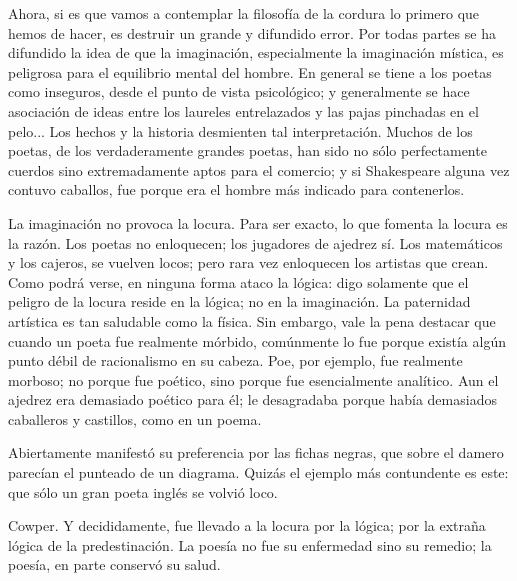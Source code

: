 Ahora, si es que vamos a contemplar la filosofía de la cordura lo primero que hemos de hacer, es
destruir un grande y difundido error. Por todas partes se ha difundido la idea de que la imaginación,
especialmente la imaginación mística, es peligrosa para el equilibrio mental del hombre. En general se
tiene a los poetas como inseguros, desde el punto de vista psicológico; y generalmente se hace asociación
de ideas entre los laureles entrelazados y las pajas pinchadas en el pelo... Los hechos y la historia
desmienten tal interpretación. Muchos de los poetas, de los verdaderamente grandes poetas, han sido no
sólo perfectamente cuerdos sino extremadamente aptos para el comercio; y si Shakespeare alguna vez
contuvo caballos, fue porque era el hombre más indicado para contenerlos.

La imaginación no provoca la locura. Para ser exacto, lo que fomenta la locura es la razón. Los
poetas no enloquecen; los jugadores de ajedrez sí. Los matemáticos y los cajeros, se vuelven locos; pero
rara vez enloquecen los artistas que crean. Como podrá verse, en ninguna forma ataco la lógica: digo
solamente que el peligro de la locura reside en la lógica; no en la imaginación. La paternidad artística es
tan saludable como la física. Sin embargo, vale la pena destacar que cuando un poeta fue realmente
mórbido, comúnmente lo fue porque existía algún punto débil de racionalismo en su cabeza. Poe, por ejemplo, fue
realmente morboso; no porque fue poético, sino porque fue esencialmente analítico. Aun el ajedrez era
demasiado poético para él; le desagradaba porque había demasiados caballeros y castillos, como en un
poema.

Abiertamente manifestó su preferencia por las fichas negras, que sobre el damero parecían el
punteado de un diagrama. Quizás el ejemplo más contundente es este: que sólo un gran poeta inglés se
volvió loco.

Cowper. Y decididamente, fue llevado a la locura por la ló\-gi\-ca; por la extraña lógica de la
predestinación. La poesía no fue su enfermedad sino su remedio; la poesía, en parte conservó su salud.

